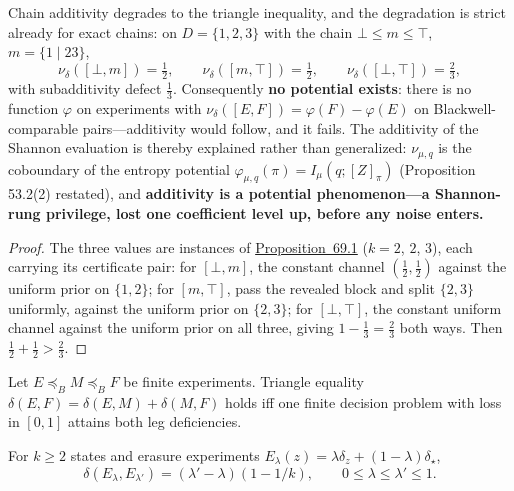 \begin{thmplain}

Chain additivity degrades to the triangle inequality, and the degradation is strict already for exact chains: on \(D = \{1, 2, 3\}\) with the chain \(\bot \le m \le \top\), \(m = \{1 \mid 23\}\),
\[
\nu_\delta([\bot, m]) = \tfrac12, \qquad \nu_\delta([m, \top]) = \tfrac12, \qquad \nu_\delta([\bot, \top]) = \tfrac23,
\]
with subadditivity defect \(\tfrac13\). Consequently \textbf{no potential exists}: there is no function \(\varphi\) on experiments with \(\nu_\delta([E,F]) = \varphi(F) - \varphi(E)\) on Blackwell-comparable pairs---\hspace{0pt}additivity would follow, and it fails. The additivity of the Shannon evaluation is thereby explained rather than generalized: \(\nu_{\mu,q}\) is the coboundary of the entropy potential \(\varphi_{\mu,q}(\pi) = I_\mu(q; [Z]_\pi)\) (Proposition 53.2(2) restated), and \textbf{additivity is a potential phenomenon---\hspace{0pt}a Shannon-rung privilege, lost one coefficient level up, before any noise enters.}
\end{thmplain}

\begin{proof}

The three values are instances of \hyperlink{stmt:69.1}{Proposition~69.1} (\(k = 2\), \(2\), \(3\)), each carrying its certificate pair: for \([\bot, m]\), the constant channel \((\tfrac12, \tfrac12)\) against the uniform prior on \(\{1, 2\}\); for \([m, \top]\), pass the revealed block and split \(\{2,3\}\) uniformly, against the uniform prior on \(\{2, 3\}\); for \([\bot, \top]\), the constant uniform channel against the uniform prior on all three, giving \(1 - \tfrac13 = \tfrac23\) both ways. Then \(\tfrac12 + \tfrac12 > \tfrac23\).
\end{proof}

\begin{thmplain}

Let \(E\preceq_B M\preceq_B F\) be finite experiments. Triangle equality \(\delta(E,F)=\delta(E,M)+\delta(M,F)\) holds iff one finite decision problem with loss in \([0,1]\) attains both leg deficiencies.

For \(k\ge2\) states and erasure experiments \(E_\lambda(z)=\lambda\delta_z+(1-\lambda)\delta_\star\),
\[\delta(E_\lambda,E_{\lambda'})=(\lambda'-\lambda)(1-1/k),\qquad0\le\lambda\le\lambda'\le1.\]
\end{thmplain}

